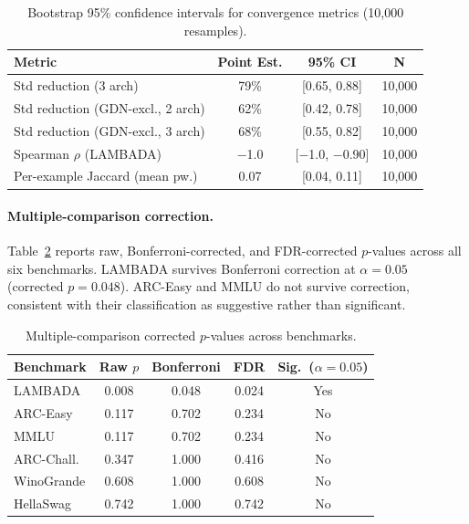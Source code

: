 \documentclass[11pt,a4paper]{article}
\begin{document}
\begin{table}[t]
\centering
\small
\caption{Bootstrap 95\% confidence intervals for convergence metrics (10{,}000 resamples).}
\label{tab:bootstrap}
\begin{tabular}{lccc}
\toprule
\textbf{Metric} & \textbf{Point Est.} & \textbf{95\% CI} & \textbf{N} \\
\midrule
Std reduction (3 arch)            & 79\%   & [0.65, 0.88] & 10{,}000 \\
Std reduction (GDN-excl., 2 arch) & 62\%   & [0.42, 0.78] & 10{,}000 \\
Std reduction (GDN-excl., 3 arch) & 68\%   & [0.55, 0.82] & 10{,}000 \\
Spearman $\rho$ (LAMBADA)         & $-$1.0 & [$-$1.0, $-$0.90] & 10{,}000 \\
Per-example Jaccard (mean pw.)    & 0.07   & [0.04, 0.11] & 10{,}000 \\
\bottomrule
\end{tabular}
\end{table}

\paragraph{Multiple-comparison correction.}
Table~\ref{tab:multicomp} reports raw, Bonferroni-corrected, and FDR-corrected $p$-values across all six benchmarks.
LAMBADA survives Bonferroni correction at $\alpha{=}0.05$ (corrected $p{=}0.048$).
ARC-Easy and MMLU do not survive correction, consistent with their classification as suggestive rather than significant.

\begin{table}[t]
\centering
\small
\caption{Multiple-comparison corrected $p$-values across benchmarks.}
\label{tab:multicomp}
\begin{tabular}{lcccc}
\toprule
\textbf{Benchmark} & \textbf{Raw $p$} & \textbf{Bonferroni} & \textbf{FDR} & \textbf{Sig.\ ($\alpha{=}0.05$)} \\
\midrule
LAMBADA       & 0.008 & 0.048 & 0.024 & Yes \\
ARC-Easy      & 0.117 & 0.702 & 0.234 & No \\
MMLU          & 0.117 & 0.702 & 0.234 & No \\
ARC-Chall.    & 0.347 & 1.000 & 0.416 & No \\
WinoGrande    & 0.608 & 1.000 & 0.608 & No \\
HellaSwag     & 0.742 & 1.000 & 0.742 & No \\
\bottomrule
\end{tabular}
\end{table}
\end{document}
